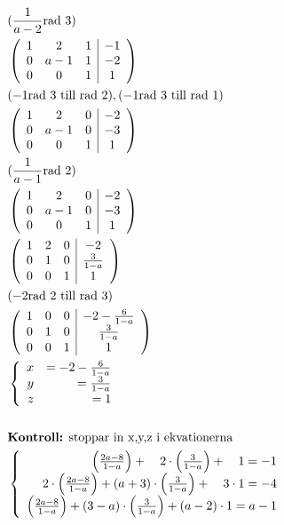 \begin{multicols}{2}
\begin{align*}
  &\quad (\frac{1}{a-2} \text{rad 3}) \\
  &\quad \left(\begin{array}{ccc|c}
    1 & 2 & 1 & -1 \\
    0 & a-1 & 1 & -2 \\
    0 & 0 & 1 & 1
  \end{array}\right) \\
  &\quad (-1 \text{rad 3 till rad 2}), (-1 \text{rad 3 till rad 1}) \\
  &\quad \left(\begin{array}{ccc|c}
    1 & 2 & 0 & -2 \\
    0 & a-1 & 0 & -3 \\
    0 & 0 & 1 & 1
  \end{array}\right) \\
  &\quad (\frac{1}{a-1} \text{rad 2}) \\
  &\quad \left(\begin{array}{ccc|c}
    1 & 2 & 0 & -2 \\
    0 & a-1 & 0 & -3 \\
    0 & 0 & 1 & 1
  \end{array}\right) \\
  &\quad \left(\begin{array}{ccc|c}
    1 & 2 & 0 & -2 \\
    0 & 1 & 0 & \frac{3}{1-a} \\
    0 & 0 & 1 & 1
  \end{array}\right) \\  
  &\quad (-2 \text{rad 2 till rad 3}) \\
  &\quad \left(\begin{array}{ccc|c}
    1 & 0 & 0 & -2 - \frac{6}{1-a} \\
    0 & 1 & 0 & \frac{3}{1-a} \\
    0 & 0 & 1 & 1
  \end{array}\right) \\  
  &\quad \left\{\begin{array}{rr}
  x & = -2 - \frac{6}{1-a} \\
  y & = \frac{3}{1-a} \\
  z & = 1
  \end{array}\right. \\
  &\quad \\
  &\quad \text{\textbf{Kontroll:} stoppar in x,y,z i ekvationerna} \\
  &\quad \left\{\begin{array}{r}
  \left(\frac{2 a-8}{1-a}\right)+\quad 2 \cdot\left(\frac{3}{1-a}\right)+\quad 1=-1 \\
  2 \cdot\left(\frac{2 a-8}{1-a}\right)+(a+3) \cdot\left(\frac{3}{1-a}\right)+\quad 3 \cdot 1=-4 \\
  \left(\frac{2 a-8}{1-a}\right)+(3-a) \cdot\left(\frac{3}{1-a}\right)+(a-2) \cdot 1=a-1
  \end{array}\right.
\end{align*}



\end{multicols}
